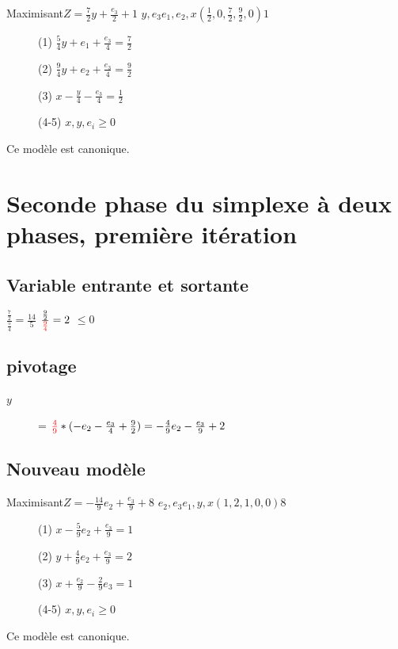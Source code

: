         {Maximisant}{$Z = \frac{7}{2}y + \frac{e_3}{2} + 1$}
        {$y,e_3$}{$e_1,e_2,x$}{$(\frac{1}{2},0,\frac{7}{2}, \frac{9}{2}, 0)$}{$1$}
        {\begin{description}
\item[] (1) $\frac{5}{4}y + e_1 + \frac{e_3}{4} = \frac{7}{2}$
\item[] (2) $\frac{9}{4}y + e_2 + \frac{e_3}{4} = \frac{9}{2}$
\item[] (3) $x - \frac{y}{4} - \frac{e_3}{4} = \frac{1}{2}$
\item[] (4-5) $x,y,e_i \geqslant 0$
\end{description}
}
Ce modèle est canonique.

\section{Seconde phase du simplexe à deux phases, première itération}
\subsection{Variable entrante et sortante}
  {$\frac{\frac{7}{2}}{\frac{5}{4}} = \frac{14}{5}$}
  {$\frac{\frac{9}{2}}{\textcolor{red}{\frac{9}{4}}} = 2$}
  {$ \leqslant 0 $}

\subsection{pivotage}
\begin{description}
\item[$y$] = $\textcolor{red}{\frac{4}{9}}*(- e_2 - \frac{e_3}{4} + \frac{9}{2}) = - \frac{4}{9} e_2 - \frac{e_3}{9} + 2$
\end{description}

\subsection{Nouveau modèle}
        {Maximisant}{$Z = -\frac{14}{9}e_2 + \frac{e_3}{9} + 8$}
        {$e_2,e_3$}{$e_1,y,x$}{$(1,2,1,0,0)$}{$8$}
        {\begin{description}
\item[] (1) $x - \frac{5}{9} e_2 + \frac{e_3}{9} = 1$
\item[] (2) $y + \frac{4}{9} e_2 + \frac{e_3}{9} = 2$
\item[] (3) $x + \frac{e_2}{9} - \frac{2}{9}e_3 = 1$
\item[] (4-5) $x,y,e_i \geqslant 0$
\end{description}
}
Ce modèle est canonique.

